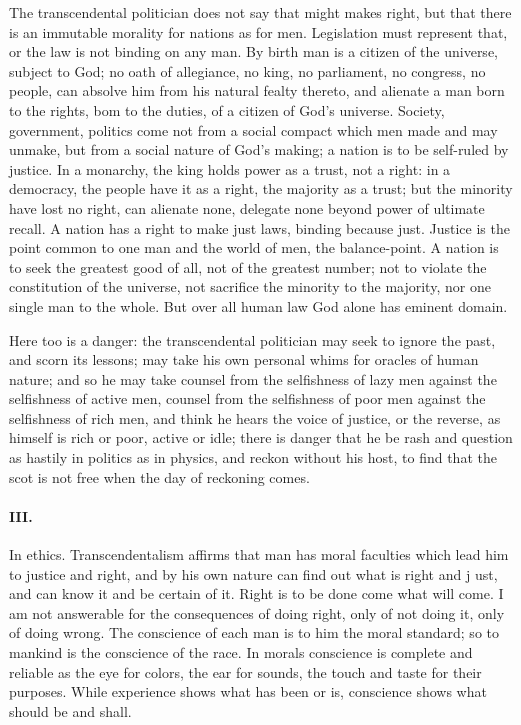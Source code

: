 \documentclass[12pt]{article}
\begin{document}
The transcendental politician does not say that might makes right, but that there is an immutable morality for nations as for men. Legislation must represent that, or the law is not binding on any man. By birth man is a citizen of the universe, subject to God; no oath of allegiance, no king, no parliament, no congress, no people, can absolve him from his natural fealty thereto, and alienate a man born to the rights, bom to the duties, of a citizen of God's universe. Society, government, politics come not from a social compact which men made and may unmake, but from a social nature of God's making; a nation is to be self-ruled by justice. In a monarchy, the king holds power as a trust, not a right: in a democracy, the people have it as a right, the majority as a trust; but the minority have lost no right, can alienate none, delegate none beyond power of ultimate recall. A nation has a right to make just laws, binding because just. Justice is the point common to one man and the world of men, the balance-point. A nation is to seek the greatest good of all, not of the greatest number; not to violate the constitution of the universe, not sacrifice the minority to the majority, nor one single man to the whole. But over all human law God alone has eminent domain. 

Here too is a danger: the transcendental politician may seek to ignore the past, and scorn its lessons; may take his own personal whims for oracles of human nature; and so he may take counsel from the selfishness of lazy men against the selfishness of active men, counsel from the selfishness of poor men against the selfishness of rich men, and think he hears the voice of justice, or the reverse, as himself is rich or poor, active or idle; there is danger that he be rash and question as hastily in politics as in physics, and reckon without his host, to find that the scot is not free when the day of reckoning comes. 

\paragraph{III.} In ethics. Transcendentalism affirms that man has moral faculties which lead him to justice and right, and by his own nature can find out what is right and j ust, and can know it and be certain of it. Right is to be done come what will come. I am not answerable for the consequences of doing right, only of not doing it, only of doing wrong. The conscience of each man is to him the moral standard; so to mankind is the conscience of the race. In morals conscience is complete and reliable as the eye for colors, the ear for sounds, the touch and taste for their purposes. While experience shows what has been or is, conscience shows what should be and shall. 
\end{document}
